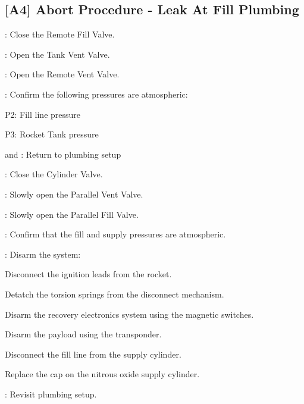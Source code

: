 \subsection{[A4] Abort Procedure - Leak At Fill Plumbing}
\begin{checklist}
    \item \control{}: Close the Remote Fill Valve.
    \item \control{}: Open the Tank Vent Valve.
    \item \control{}: Open the Remote Vent Valve.
    \item \control{}: Confirm the following pressures are atmospheric:
    \begin{checklist}
        \item P2: Fill line pressure
        \item P3: Rocket Tank pressure
    \end{checklist}
    \item \primary{} and \secondary{}: Return to plumbing setup
    \item \primary{}: Close the Cylinder Valve.
    \item \primary{}: Slowly open the Parallel Vent Valve.
    \item \primary{}: Slowly open the Parallel Fill Valve.
    \item \control{}: Confirm that the fill and supply pressures are atmospheric.
    \item \primary{}: Disarm the system:
        \begin{checklist}    
            \item Disconnect the ignition leads from the rocket.
            \item Detatch the torsion springs from the disconnect mechanism.
            \item Disarm the recovery electronics system using the magnetic switches.
            \item Disarm the payload using the transponder.
            \item Disconnect the fill line from the supply cylinder.
            \item Replace the cap on the nitrous oxide supply cylinder.
        \end{checklist}
    \item \ops{}: Revisit plumbing setup.
\end{checklist}
\setcounter{checklistnum}{0}

